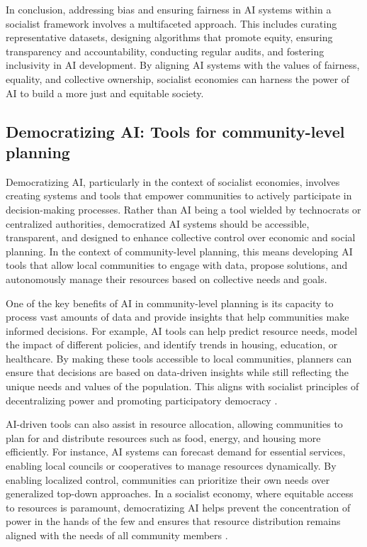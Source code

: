 \begin{refsection}
In conclusion, addressing bias and ensuring fairness in AI systems within a socialist framework involves a multifaceted approach. This includes curating representative datasets, designing algorithms that promote equity, ensuring transparency and accountability, conducting regular audits, and fostering inclusivity in AI development. By aligning AI systems with the values of fairness, equality, and collective ownership, socialist economies can harness the power of AI to build a more just and equitable society.

\subsection{Democratizing AI: Tools for community-level planning}

Democratizing AI, particularly in the context of socialist economies, involves creating systems and tools that empower communities to actively participate in decision-making processes. Rather than AI being a tool wielded by technocrats or centralized authorities, democratized AI systems should be accessible, transparent, and designed to enhance collective control over economic and social planning. In the context of community-level planning, this means developing AI tools that allow local communities to engage with data, propose solutions, and autonomously manage their resources based on collective needs and goals.

One of the key benefits of AI in community-level planning is its capacity to process vast amounts of data and provide insights that help communities make informed decisions. For example, AI tools can help predict resource needs, model the impact of different policies, and identify trends in housing, education, or healthcare. By making these tools accessible to local communities, planners can ensure that decisions are based on data-driven insights while still reflecting the unique needs and values of the population. This aligns with socialist principles of decentralizing power and promoting participatory democracy \cite[pp.~45-47]{tapscott2016}. 

AI-driven tools can also assist in resource allocation, allowing communities to plan for and distribute resources such as food, energy, and housing more efficiently. For instance, AI systems can forecast demand for essential services, enabling local councils or cooperatives to manage resources dynamically. By enabling localized control, communities can prioritize their own needs over generalized top-down approaches. In a socialist economy, where equitable access to resources is paramount, democratizing AI helps prevent the concentration of power in the hands of the few and ensures that resource distribution remains aligned with the needs of all community members \cite[pp.~98-101]{schneider2018}.


\end{refsection}
